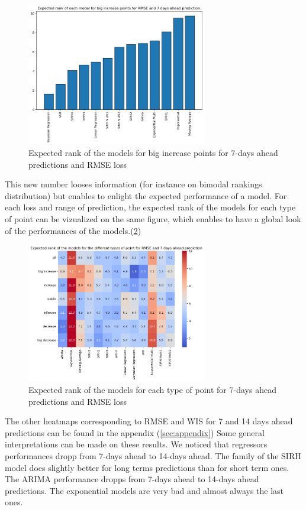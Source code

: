 \begin{figure}[h]
    \centering
    \includegraphics[width=0.7\textwidth]{figures/expected_ranks_big_increase_RMSE_7.png}
    \caption{Expected rank of the models for big increase points for 7-days ahead predictions and RMSE loss}
    \label{fig:expected_rank}
\end{figure}
This new number looses information (for instance on bimodal rankings distribution) but enables to enlight the expected performance of a model. 
For each loss and range of prediction, the expected rank of the models for each type of point can be vizualized on the same figure, which enables to have a global look of the performances of the models.(\ref{fig:heatmap_RMSE_7}) 
\begin{figure}[h]
    \centering
    \includegraphics[width=0.7\textwidth]{figures/heatmap_RMSE_7.png}
    \caption{Expected rank of the models for each type of point for 7-days ahead predictions and RMSE loss}
    \label{fig:heatmap_RMSE_7}
\end{figure}


The other heatmaps corresponding to RMSE and WIS for 7 and 14 days ahead predictions can be found in the appendix (\ref{sec:appendix})
Some general interpretations can be made on these results. 
We noticed that regressors performances dropp from 7-days ahead to 14-days ahead. 
The family of the SIRH model does slightly better for long terms predictions than for short term ones. 
The ARIMA performance dropps from 7-days ahead to 14-days ahead predictions. 
The exponential models are very bad and almost always the last ones. 

